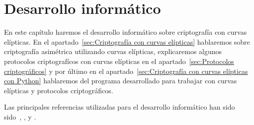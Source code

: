 \chapter{Desarrollo informático}
\label{ch:Desarrollo informático}

En este capítulo haremos el desarrollo informático sobre criptografía con curvas elípticas. En el apartado~\ref{sec:Criptografía con curvas elípticas} hablaremos sobre criptografía asimétrica utilizando curvas elípticas, explicaremos algunos protocolos criptografícos con curvas elípticas en el apartado~\ref{sec:Protocolos criptográficos} y por último en el apartado~\ref{sec:Criptografía con curvas elípticas con Python} hablaremos del programa desarrollado para trabajar con curvas elípticas y protocolos criptográficos.

Las principales referencias utilizadas para el desarrollo informático han sido sido~\cite{Hankerson:2003}, \cite{Menezes:1996}, \cite{Washington:2008} y \cite{Silverman:2009}.




